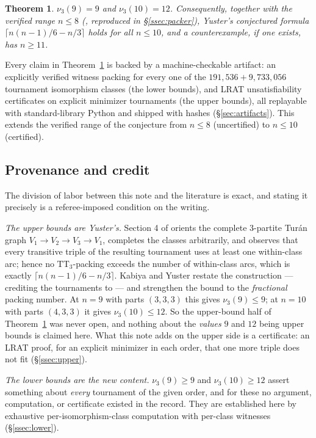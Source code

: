\documentclass[11pt]{amsart}
\newcommand{\TT}{\mathrm{TT}_3}
\newcommand{\nut}{\nu_3}
\theoremstyle{plain}
\newtheorem{theorem}{Theorem}[section]
\theoremstyle{definition}
\theoremstyle{remark}
\begin{document}
\begin{theorem}\label{thm:main}
$\nut(9)=9$ and $\nut(10)=12$. Consequently, together with the verified
range $n\le 8$ (\cite{Yuster04}, reproduced in \S\ref{ssec:packer}),
Yuster's conjectured formula $\lceil n(n-1)/6-n/3\rceil$ holds for all
$n\le 10$, and a counterexample, if one exists, has $n\ge 11$.
\end{theorem}

Every claim in Theorem~\ref{thm:main} is backed by a machine-checkable
artifact: an explicitly verified witness packing for every one of the
$191{,}536+9{,}733{,}056$ tournament isomorphism classes (the lower
bounds), and LRAT unsatisfiability certificates on explicit minimizer
tournaments (the upper bounds), all replayable with standard-library
Python and shipped with hashes (\S\ref{sec:artifacts}). This extends the verified
range of the conjecture from $n\le8$ (uncertified) to
$n\le10$ (certified).

\subsection{Provenance and credit}\label{ssec:credit}
The division of labor between this note and the literature is exact, and
stating it precisely is a referee-imposed condition on the writing.

\emph{The upper bounds are Yuster's.} Section 4 of \cite{Yuster04}
orients the complete $3$-partite Tur\'an graph
$V_1\to V_2\to V_3\to V_1$, completes the classes arbitrarily, and
observes that every transitive triple of the resulting tournament uses at
least one within-class arc; hence no $\TT$-packing exceeds the number of
within-class arcs, which is exactly $\lceil n(n-1)/6-n/3\rceil$. Kabiya
and Yuster \cite[\S2.4]{KY08} restate the construction --- crediting the
tournaments to \cite{Yuster04} --- and strengthen the bound to the
\emph{fractional} packing number. At $n=9$
with parts $(3,3,3)$ this gives $\nut(9)\le 9$; at $n=10$ with parts
$(4,3,3)$ it gives $\nut(10)\le 12$. So the upper-bound half of
Theorem~\ref{thm:main} was never open, and nothing about the
\emph{values} $9$ and $12$ being upper bounds is claimed here. What this
note adds on the upper side is a certificate: an LRAT proof, for an
explicit minimizer in each order, that one more triple does not fit
(\S\ref{ssec:upper}).

\emph{The lower bounds are the new content.} $\nut(9)\ge 9$ and
$\nut(10)\ge 12$ assert something about \emph{every} tournament of the
given order, and for these no argument, computation, or certificate
existed in the record. They are established here by exhaustive
per-isomorphism-class computation with per-class witnesses
(\S\ref{ssec:lower}).
\end{document}
